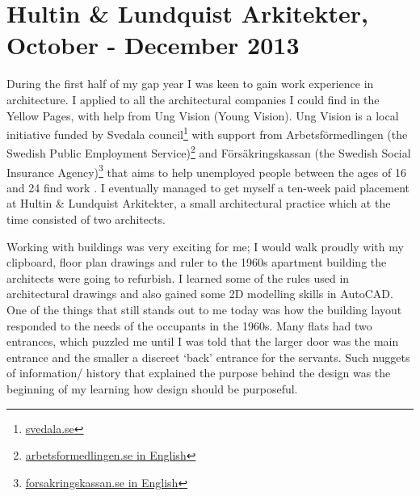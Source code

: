 
\section{Hultin \& Lundquist Arkitekter, October - December 2013}


During the first half of my gap year I was keen to gain work experience in architecture. I applied to all the architectural companies I could find in the Yellow Pages, with help from Ung Vision (Young Vision).
Ung Vision is a local initiative funded by Svedala council\footnote{\href{https://www.svedala.se/}{svedala.se}} with support from Arbetsförmedlingen (the Swedish Public Employment Service)\footnote{\href{https://www.arbetsformedlingen.se/Globalmeny/Other-languages/Languages/English-engelska.html}{arbetsformedlingen.se in English}} and Försäkringskassan (the Swedish Social Insurance Agency)\footnote{\href{https://www.forsakringskassan.se/privatpers/!ut/p/z1/04_Sj9CPykssy0xPLMnMz0vMAfIjo8ziTTxcnA3dnQ28LdyNTQ0cAwMMjU38jby8gg30w_Wj9KOASgxwAEcD_YLsbEUAFUIRCA!!/dz/d5/L0lDUmlTUSEhL3dHa0FKRnNBLzROV3FpQSEhL2Vu/?keepNavState=true}{forsakringskassan.se in English}} that aims to help unemployed people between the ages of 16 and 24 find work \citep{ungvision:online}.
I eventually managed to get myself a ten-week paid placement at Hultin \& Lundquist Arkitekter, a small architectural practice which at the time consisted of two architects.

Working with buildings was very exciting for me; I would walk proudly with my clipboard, floor plan drawings and ruler to the 1960s apartment building the architects were going to refurbish.
I learned some of the rules used in architectural drawings and also gained some 2D modelling skills in  AutoCAD.
One of the things that still stands out to me today was how the building layout responded to the needs of the occupants in the 1960s.
Many flats had two entrances, which puzzled me until I was told that the larger door was the main entrance and the smaller a discreet `back' entrance for the servants.
Such nuggets of information/ history that explained the purpose behind the design was the beginning of my learning how design should be purposeful.
